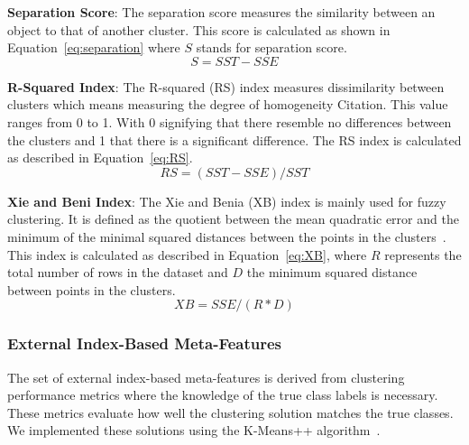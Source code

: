 \documentclass{article}
\begin{document}
\begin{description}
    \item \textbf{Separation Score}: The separation score measures the similarity between an object to that of another cluster. This score is calculated as shown in Equation~\autoref{eq:separation} where $S$ stands for separation score.
    \begin{equation}
    S=SST-SSE
    \label{eq:separation}
    \end{equation}

\item \textbf{R-Squared Index}: The R-squared (RS) index measures dissimilarity between clusters which means measuring the degree of homogeneity Citation. This value ranges from 0 to 1. With 0 signifying that there resemble no differences between the clusters and 1 that there is a significant difference. The RS index is calculated as described in Equation~\autoref{eq:RS}.
    \begin{equation}
      RS=(SST-SSE)/SST
      \label{eq:RS}
    \end{equation}
    
    \item \textbf{Xie and Beni Index}: The Xie and Benia (XB) index is mainly used for fuzzy clustering. It is defined as the quotient between the mean quadratic error and the minimum of the minimal squared distances between the points in the clusters~\cite{xieValidityMeasureFuzzy1991}. This index is calculated as described in Equation~\autoref{eq:XB}, where $R$ represents the total number of rows in the dataset and $D$ the minimum squared distance between points in the clusters.
\begin{equation}
  XB=SSE/(R*D)
  \label{eq:XB}
\end{equation}
\end{description}

\subsubsection{External Index-Based Meta-Features}
The set of external index-based meta-features is derived from clustering performance metrics where the knowledge of the true class labels is necessary. These metrics evaluate how well the clustering solution matches the true classes. We implemented these solutions using the K-Means++ algorithm~\cite{arthurKmeansAdvantagesCareful2007}.
\end{document}
